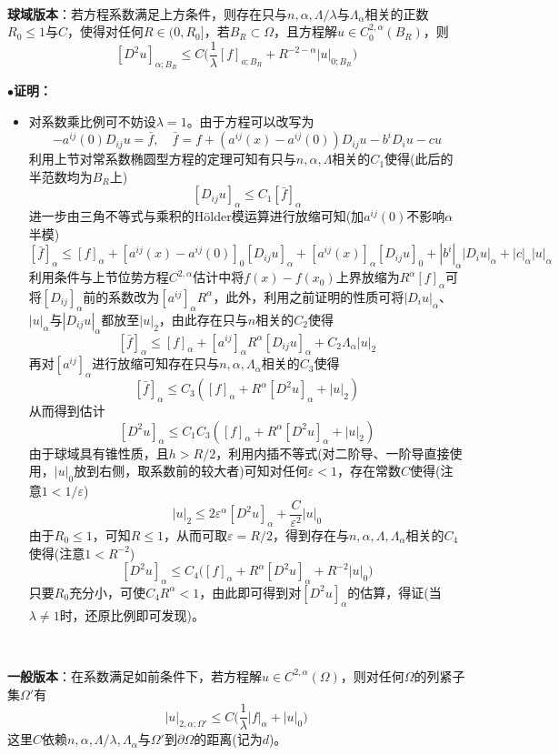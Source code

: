 \documentclass[a4paper,UTF8,fontset=windows,AutoFakeBold]{ctexart}
\newcommand{\proo}[1]{{\kaishu $\bullet$\textbf{证明：}
\begin{itemize}
    \item[] #1
\end{itemize}
}}
\begin{document}
\

\textbf{球域版本}：若方程系数满足上方条件，则存在只与$n,\alpha,\Lambda/\lambda$与$\Lambda_\alpha$相关的正数$R_0\le 1$与$C$，使得对任何$R\in(0,R_0]$，若$B_R\subset\Omega$，且方程解$u\in C_0^{2,\alpha}(B_R)$，则
$$[D^2u]_{\alpha;B_R}\le C\bigg(\frac{1}{\lambda}[f]_{a;B_R}+R^{-2-\alpha}|u|_{0;B_R}\bigg)$$

\proo{
    对系数乘比例可不妨设$\lambda=1$。由于方程可以改写为
    $$-a^{ij}(0)D_{ij}u=\bar{f},\quad\bar{f}=f+(a^{ij}(x)-a^{ij}(0))D_{ij}u-b^iD_iu-cu$$
    利用上节对常系数椭圆型方程的定理可知有只与$n,\alpha,\Lambda$相关的$C_1$使得(此后的半范数均为$B_R$上)
    $$[D_{ij}u]_\alpha\le C_1[\bar{f}]_\alpha$$
    进一步由三角不等式与乘积的H\"older模运算进行放缩可知(加$a^{ij}(0)$不影响$\alpha$半模)
    $$[\bar{f}]_\alpha\le[f]_\alpha+[a^{ij}(x)-a^{ij}(0)]_0[D_{ij}u]_\alpha+[a^{ij}(x)]_\alpha[D_{ij}u]_0+|b^i|_\alpha|D_iu|_\alpha+|c|_\alpha|u|_\alpha$$
    利用条件与上节位势方程$C^{2,\alpha}$估计中将$f(x)-f(x_0)$上界放缩为$R^\alpha[f]_\alpha$可将$[D_{ij}]_\alpha$前的系数改为$[a^{ij}]_\alpha R^\alpha$，此外，利用之前证明的性质可将$|D_iu|_\alpha$、$|u|_\alpha$与$|D_{ij}u|_\alpha$都放至$|u|_2$，由此存在只与$n$相关的$C_2$使得
    $$[\bar{f}]_\alpha\le[f]_\alpha+[a^{ij}]_\alpha R^\alpha[D_{ij}u]_\alpha+C_2\Lambda_\alpha|u|_2$$
    再对$[a^{ij}]_\alpha$进行放缩可知存在只与$n,\alpha,\Lambda_\alpha$相关的$C_3$使得
    $$[\bar{f}]_\alpha\le C_3([f]_\alpha+R^\alpha[D^2u]_\alpha+|u|_2)$$
    从而得到估计
    $$[D^2u]_\alpha\le C_1C_3([f]_\alpha+R^\alpha[D^2u]_\alpha+|u|_2)$$
    由于球域具有锥性质，且$h>R/2$，利用内插不等式(对二阶导、一阶导直接使用，$|u|_0$放到右侧，取系数前的较大者)可知对任何$\varepsilon<1$，存在常数$C$使得(注意$1<1/\varepsilon$)
    $$|u|_2\le2\varepsilon^\alpha[D^2u]_\alpha+\frac{C}{\varepsilon^2}|u|_0$$
    由于$R_0\le1$，可知$R\le1$，从而可取$\varepsilon=R/2$，得到存在与$n,\alpha,\Lambda,\Lambda_\alpha$相关的$C_4$使得(注意$1<R^{-2}$)
    $$[D^2u]_\alpha\le C_4\big([f]_\alpha+R^\alpha[D^2u]_\alpha+R^{-2}|u|_0\big)$$
    只要$R_0$充分小，可使$C_4R^\alpha<1$，由此即可得到对$[D^2u]_\alpha$的估算，得证(当$\lambda\ne1$时，还原比例即可发现)。
}

\

\textbf{一般版本}：在系数满足如前条件下，若方程解$u\in C^{2,\alpha}(\Omega)$，则对任何$\Omega$的列紧子集$\Omega'$有
$$|u|_{2,\alpha;\Omega'}\le C\bigg(\frac{1}{\lambda}|f|_\alpha+|u|_0\bigg)$$
这里$C$依赖$n,\alpha,\Lambda/\lambda,\Lambda_\alpha$与$\Omega'$到$\partial\Omega$的距离(记为$d$)。
\end{document}

